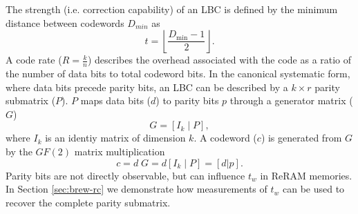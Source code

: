 The strength (i.e. correction capability) of an LBC is defined by the minimum distance between codewords $D_{min}$ as
{
\setlength{\abovedisplayskip}{2pt}
\setlength{\belowdisplayskip}{2pt}
\begin{equation}
    t=\left\lfloor \frac{D_{\min}-1}{2} \right\rfloor.
\end{equation}
}
A code rate ($R=\frac{k}{n}$) describes the overhead associated with the code as a ratio of the number of data bits to total codeword bits. In the canonical systematic form, where data bits precede parity bits, an LBC can be described by a $k \times r$ parity submatrix ($P$). $P$ maps data bits ($d$) to parity bits $p$ through a generator matrix ($G$)
{
\setlength{\abovedisplayskip}{2pt}
\setlength{\belowdisplayskip}{2pt}
\begin{equation}
    G = \left[I_k \mid P\right],
\end{equation}
}
where $I_k$ is an identiy matrix of dimension $k$.
A codeword ($c$) is generated from $G$ by the $GF(2)$ matrix multiplication
{
\setlength{\abovedisplayskip}{2pt}
\setlength{\belowdisplayskip}{2pt}
\begin{equation}
    c = d \; G = d\left[I_k \mid P\right] = \left[d | p\right].
\end{equation}
}
Parity bits are not directly observable, but can influence $t_w$ in ReRAM memories. In Section \ref{sec:brew-rc} we demonstrate how measurements of $t_w$ can be used to recover the complete parity submatrix.



